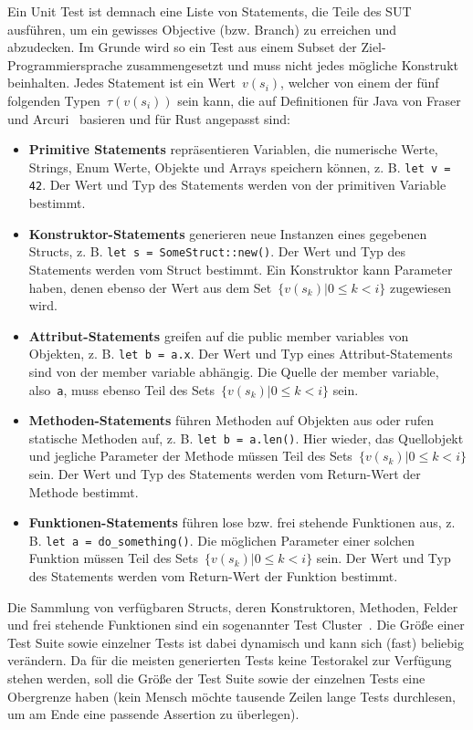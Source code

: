\documentclass{article}
\begin{document}
Ein Unit Test ist demnach eine Liste von Statements, die Teile des \ac{SUT} ausführen, um ein gewisses Objective (bzw. Branch) zu erreichen und abzudecken. Im Grunde wird so ein Test aus einem Subset der Ziel-Programmiersprache zusammengesetzt und muss nicht jedes mögliche Konstrukt beinhalten. Jedes Statement ist ein Wert~$v(s_i)$, welcher von einem der fünf folgenden Typen~$\tau(v(s_i))$ sein kann, die auf Definitionen für Java von Fraser und Arcuri~\cite{Fraser_2013} basieren und für Rust angepasst sind:
\begin{itemize} 
    \item \textbf{Primitive Statements} repräsentieren Variablen, die numerische Werte, Strings, Enum Werte, Objekte und Arrays speichern können, z. B. \lstinline{let v = 42}. Der Wert und Typ des Statements werden von der primitiven Variable bestimmt. 
    \item \textbf{Konstruktor-Statements} generieren neue Instanzen eines gegebenen Structs, z. B. \lstinline{let s = SomeStruct::new()}. Der Wert und Typ des Statements werden vom Struct bestimmt. Ein Konstruktor kann Parameter haben, denen ebenso der Wert aus dem Set~$\{v(s_k) | 0 \leq k < i\}$ zugewiesen wird.
    \item \textbf{Attribut-Statements} greifen auf die public member variables von Objekten, z. B. \lstinline{let b = a.x}. Der Wert und Typ eines Attribut-Statements sind von der member variable abhängig. Die Quelle der member variable, also~\lstinline{a}, muss ebenso Teil des Sets~$\{v(s_k) | 0 \leq k < i\}$ sein. 
    \item \textbf{Methoden-Statements} führen Methoden auf Objekten aus oder rufen statische Methoden auf, z. B. \lstinline{let b = a.len()}. Hier wieder, das Quellobjekt und jegliche Parameter der Methode müssen Teil des Sets~$\{v(s_k) | 0 \leq k < i\}$ sein. Der Wert und Typ des Statements werden vom Return-Wert der Methode bestimmt. 
    \item \textbf{Funktionen-Statements} führen lose bzw. frei stehende Funktionen aus, z. B. \lstinline{let a = do_something()}. Die möglichen Parameter einer solchen Funktion müssen Teil des Sets~$\{v(s_k) | 0 \leq k < i\}$ sein. Der Wert und Typ des Statements werden vom Return-Wert der Funktion bestimmt. 
\end{itemize}

Die Sammlung von verfügbaren Structs, deren Konstruktoren, Methoden, Felder und frei stehende Funktionen sind ein sogenannter Test Cluster~\cite{Fraser_2011}. Die Größe einer Test Suite sowie einzelner Tests ist dabei dynamisch und kann sich (fast) beliebig verändern. Da für die meisten generierten Tests keine Testorakel zur Verfügung stehen werden, soll die Größe der Test Suite sowie der einzelnen Tests eine Obergrenze haben (kein Mensch möchte tausende Zeilen lange Tests durchlesen, um am Ende eine passende Assertion zu überlegen).
\end{document}
